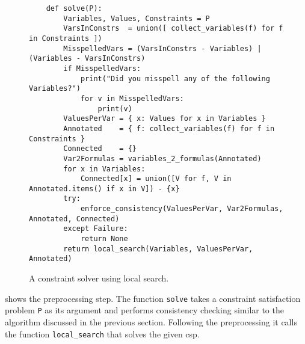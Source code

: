 \begin{figure}[!ht]
\centering
\begin{verbatim}
    def solve(P):
        Variables, Values, Constraints = P
        VarsInConstrs  = union([ collect_variables(f) for f in Constraints ])
        MisspelledVars = (VarsInConstrs - Variables) | (Variables - VarsInConstrs)
        if MisspelledVars:
            print("Did you misspell any of the following Variables?")
            for v in MisspelledVars:
                print(v)
        ValuesPerVar = { x: Values for x in Variables }
        Annotated    = { f: collect_variables(f) for f in Constraints }
        Connected    = {}
        Var2Formulas = variables_2_formulas(Annotated)
        for x in Variables:
            Connected[x] = union([V for f, V in Annotated.items() if x in V]) - {x}
        try:
            enforce_consistency(ValuesPerVar, Var2Formulas, Annotated, Connected)
        except Failure:
            return None
        return local_search(Variables, ValuesPerVar, Annotated)
\end{verbatim}
\vspace*{-0.3cm}
\caption{A constraint solver using local search.}
\label{fig:Local-Search.ipynb:solve}
\end{figure}

 shows the preprocessing step.  The function \texttt{solve} takes a constraint
satisfaction problem \texttt{P} as its argument and performs consistency checking similar to the algorithm
discussed in the previous section.  Following the preprocessing it calls the function \texttt{local\_search}
that solves the given \ac{csp}.

